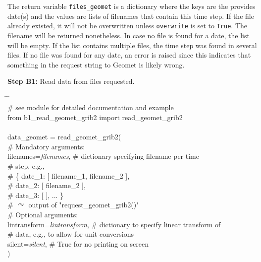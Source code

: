 \documentclass[10pt,a4paper,titlepage,parskip]{scrartcl}
\newenvironment{ttfont}{\fontfamily{\ttdefault}\selectfont}{\par}
\newcommand{\GRAU}[1]{\textcolor{ufzgray2}{#1}}
\begin{document}
\vspace*{-0.3cm}
The return variable \texttt{files\_geomet} is a dictionary where the keys are the provides date(s) and the values are lists of filenames that contain this time step. If the file already existed, it will not be overwritten unless \texttt{overwrite} is set to \texttt{True}. The filename will be returned nonetheless. In case no file is found for a date, the list will be empty. If the list contains multiple files, the time step was found in several files. If no file was found for any date, an error is raised since this indicates that something in the request string to Geomet is likely wrong. 
\pagebreak

\textbf{Step B1:} Read data from files requested.
\begin{framed}
	\vspace*{-1.2cm}
	\begin{ttfont}
		\begin{tabbing}
			\hspace{1.0cm} \= \hspace{5.2cm} \= \kill \\[4pt]
			\GRAU{\# see module for detailed documentation and example}\\
			from b1\_read\_geomet\_grib2 import read\_geomet\_grib2\\
			\\
			data\_geomet = read\_geomet\_grib2(\\
			\> \GRAU{\# Mandatory arguments:}\\
			\> filenames=\textit{filenames}, \> \GRAU{\# dictionary specifying filename per time}\\
			\>  \> \GRAU{\# step, e.g.,}\\
			\>  \> \GRAU{\#  \{ date\_1: [ filename\_1, filename\_2 ],}\\
			\>  \> \GRAU{\# \hspace*{0.2cm}    date\_2: [ filename\_2 ],}\\
			\>  \> \GRAU{\# \hspace*{0.2cm}    date\_3: [ ], ... \}}\\
			\>  \> \GRAU{\# $\curvearrowright$ output of "request\_geomet\_grib2()"}\\
			\> \GRAU{\# Optional arguments:}\\
			\> lintransform=\textit{lintransform}, \> \GRAU{\# dictionary to specify linear transform of}\\
			\>  \> \GRAU{\# data, e.g., to allow for unit conversions}\\
			\> silent=\textit{silent}, \> \GRAU{\# True for no printing on screen}\\
			\> ) \> 
		\end{tabbing}
	\end{ttfont}
	\vspace*{-0.3cm}
\end{framed}
\end{document}
